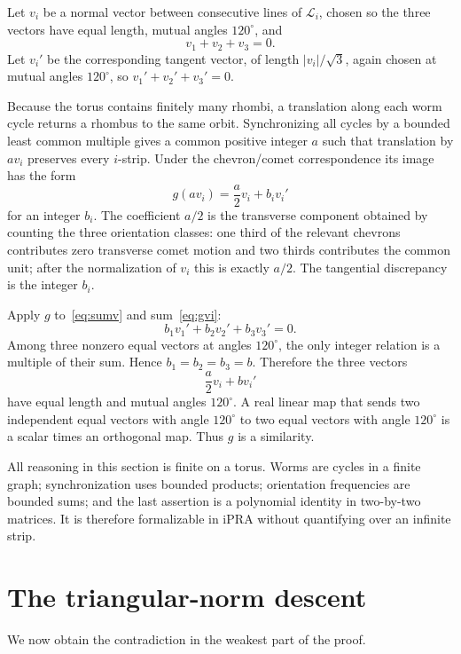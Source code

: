 \documentclass[11pt]{article}
\newcommand{\iPRA}{\mathrm{iPRA}}
\begin{document}
Let $v_i$ be a normal vector between consecutive lines of $\mathcal L_i$, chosen so the
three vectors have equal length, mutual angles $120^\circ$, and
\begin{equation}\label{eq:sumv}
  v_1+v_2+v_3=0.
\end{equation}
Let $v_i'$ be the corresponding tangent vector, of length $|v_i|/\sqrt3$, again chosen at
mutual angles $120^\circ$, so $v_1'+v_2'+v_3'=0$.

Because the torus contains finitely many rhombi, a translation along each worm cycle
returns a rhombus to the same orbit.  Synchronizing all cycles by a bounded least common
multiple gives a common positive integer $a$ such that translation by $a v_i$ preserves
every $i$-strip.  Under the chevron/comet correspondence its image has the form
\begin{equation}\label{eq:gvi}
 g(a v_i)=\frac a2 v_i+b_i v_i'
\end{equation}
for an integer $b_i$.  The coefficient $a/2$ is the transverse component obtained by
counting the three orientation classes: one third of the relevant chevrons contributes
zero transverse comet motion and two thirds contributes the common unit; after the
normalization of $v_i$ this is exactly $a/2$.  The tangential discrepancy is the integer
$b_i$.

Apply $g$ to~\eqref{eq:sumv} and sum~\eqref{eq:gvi}:
\[
  b_1v_1'+b_2v_2'+b_3v_3'=0.
\]
Among three nonzero equal vectors at angles $120^\circ$, the only integer relation is a
multiple of their sum.  Hence $b_1=b_2=b_3=b$.  Therefore the three vectors
\[
 \frac a2v_i+bv_i'
\]
have equal length and mutual angles $120^\circ$.  A real linear map that sends two
independent equal vectors with angle $120^\circ$ to two equal vectors with angle
$120^\circ$ is a scalar times an orthogonal map.  Thus $g$ is a similarity.

All reasoning in this section is finite on a torus.  Worms are cycles in a finite graph;
synchronization uses bounded products; orientation frequencies are bounded sums; and the
last assertion is a polynomial identity in two-by-two matrices.  It is therefore
formalizable in $\iPRA$ without quantifying over an infinite strip.

\section{The triangular-norm descent}\label{sec:2adic}

We now obtain the contradiction in the weakest part of the proof.
\end{document}
